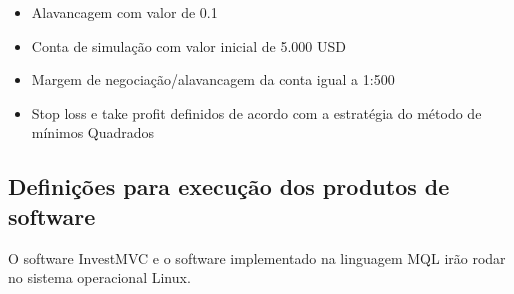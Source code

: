 \begin{itemize}
\item Alavancagem com valor de 0.1
\item Conta de simulação com valor inicial de 5.000 USD
\item Margem de negociação/alavancagem da conta igual a 1:500
\item Stop loss e take profit definidos de acordo com a estratégia do método de mínimos Quadrados
\end{itemize}

\subsection{Definições para execução dos produtos de software}
O software InvestMVC e o software implementado na linguagem MQL irão rodar no sistema operacional Linux.